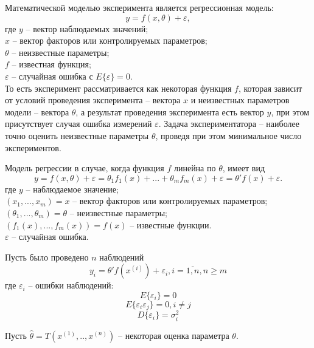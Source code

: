 Математической моделью эксперимента является регрессионная модель:
\begin{equation}\label{eq:regression-common-case}
y = f(x, \theta) + \varepsilon,
\end{equation}
где $y$ -- вектор наблюдаемых значений;\\
$x$ -- вектор факторов или контролируемых параметров;\\
$\theta$ -- неизвестные параметры;\\
$f$ -- известная функция;\\
$\varepsilon$ -- случайная ошибка с $E\{\varepsilon\} = 0$.\\
То есть эксперимент рассматривается как некоторая функция $f$, которая зависит от условий проведения эксперимента -- вектора $x$ и неизвестных параметров модели -- вектора $\theta$, а результат проведения эксперимента есть вектор $y$, при этом присутствует случая ошибка измерений $\varepsilon$. 
Задача экспериментатора -- наиболее точно оценить неизвестные параметры $\theta$, проведя при этом минимальное число экспериментов.

Модель регрессии в случае, когда функция $f$ линейна по $\theta$, имеет вид
\begin{equation}
y = f(x, \theta) + \varepsilon= \theta_1 f_1(x) +...+ \theta_m f_m(x) + \varepsilon = \theta'f(x) + \varepsilon.
\end{equation}
где $y$ -- наблюдаемое значение;\\
$(x_1,...,x_m)=x$ -- вектор факторов или контролируемых параметров;\\
$(\theta_1,...,\theta_m)=\theta$ -- неизвестные параметры;\\
$(f_1(x),...,f_m(x))=f(x)$ -- известные функции.\\
$\varepsilon$ -- случайная ошибка.

Пусть было проведено $n$ наблюдений
\begin{equation}
y_i = \theta' f(x^{(i)}) + \varepsilon_i, i = \overline{1, n}, n \ge m
\end{equation}
где $\varepsilon_i$ -- ошибки наблюдений:
$$E\{\varepsilon_i\} = 0$$
$$E\{\varepsilon_i \varepsilon_j\} = 0, i \ne j$$
$$D\{\varepsilon_i\}=\sigma_i ^2$$

Пусть $\hat{\theta} =T(x^{(1)},..,x^{(n)}) $ -- некоторая оценка параметра $\theta$.\\

\newtheorem{theorem}{Теорема}

